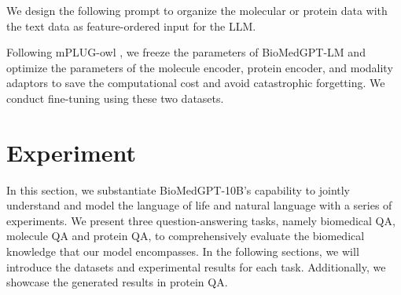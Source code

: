\documentclass{article}
\begin{document}
We design the following prompt to organize the molecular or protein data with the text data as feature-ordered input for the LLM.


\begin{table}[h]
    \caption{Prompt for organizing multi-modality data entry.}
    \centering
    \label{prompt}
\end{table}


Following mPLUG-owl \citep{ye2023mplugowl}, we freeze the parameters of BioMedGPT-LM and optimize the parameters of the molecule encoder, protein encoder, and modality adaptors to save the computational cost and avoid catastrophic forgetting. We conduct fine-tuning using these two datasets.



\section{Experiment}
In this section, we substantiate BioMedGPT-10B's capability to jointly understand and model the language of life and natural language with a series of experiments. We present three question-answering tasks, namely biomedical QA, molecule QA and protein QA, to comprehensively evaluate the biomedical knowledge that our model encompasses. In the following sections, we will introduce the datasets and experimental results for each task. Additionally, we showcase the generated results in protein QA.
\end{document}
